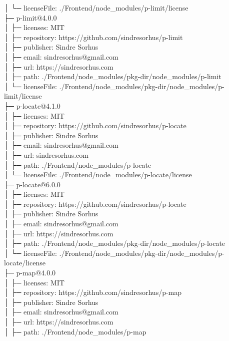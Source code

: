 │  └─ licenseFile: ./Frontend/node\_modules/p-limit/license\\
├─ p-limit@4.0.0\\
│  ├─ licenses: MIT\\
│  ├─ repository: https://github.com/sindresorhus/p-limit\\
│  ├─ publisher: Sindre Sorhus\\
│  ├─ email: sindresorhus@gmail.com\\
│  ├─ url: https://sindresorhus.com\\
│  ├─ path: ./Frontend/node\_modules/pkg-dir/node\_modules/p-limit\\
│  └─ licenseFile: ./Frontend/node\_modules/pkg-dir/node\_modules/p-limit/license\\
├─ p-locate@4.1.0\\
│  ├─ licenses: MIT\\
│  ├─ repository: https://github.com/sindresorhus/p-locate\\
│  ├─ publisher: Sindre Sorhus\\
│  ├─ email: sindresorhus@gmail.com\\
│  ├─ url: sindresorhus.com\\
│  ├─ path: ./Frontend/node\_modules/p-locate\\
│  └─ licenseFile: ./Frontend/node\_modules/p-locate/license\\
├─ p-locate@6.0.0\\
│  ├─ licenses: MIT\\
│  ├─ repository: https://github.com/sindresorhus/p-locate\\
│  ├─ publisher: Sindre Sorhus\\
│  ├─ email: sindresorhus@gmail.com\\
│  ├─ url: https://sindresorhus.com\\
│  ├─ path: ./Frontend/node\_modules/pkg-dir/node\_modules/p-locate\\
│  └─ licenseFile: ./Frontend/node\_modules/pkg-dir/node\_modules/p-locate/license\\
├─ p-map@4.0.0\\
│  ├─ licenses: MIT\\
│  ├─ repository: https://github.com/sindresorhus/p-map\\
│  ├─ publisher: Sindre Sorhus\\
│  ├─ email: sindresorhus@gmail.com\\
│  ├─ url: https://sindresorhus.com\\
│  ├─ path: ./Frontend/node\_modules/p-map\\
